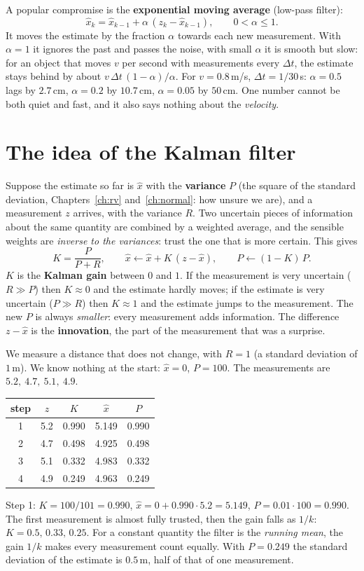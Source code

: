 A popular compromise is the \textbf{exponential moving average} (low-pass filter):
\[
\hat x_k=\hat x_{k-1}+\alpha\,(z_k-\hat x_{k-1}),\qquad 0<\alpha\le1 .
\]
It moves the estimate by the fraction $\alpha$ towards each new measurement. With $\alpha=1$ it ignores the past and passes the noise, with small $\alpha$ it is smooth but slow: for an object that moves $v$ per second with measurements every $\Delta t$, the estimate stays behind by about $v\,\Delta t\,(1-\alpha)/\alpha$. For $v=0.8$\,m/s, $\Delta t=1/30$\,s: $\alpha=0.5$ lags by $2.7$\,cm, $\alpha=0.2$ by $10.7$\,cm, $\alpha=0.05$ by $50$\,cm. One number cannot be both quiet and fast, and it also says nothing about the \emph{velocity}.

\section*{The idea of the Kalman filter}
Suppose the estimate so far is $\hat x$ with the \textbf{variance} $P$ (the square of the standard deviation, Chapters~\ref{ch:rv} and~\ref{ch:normal}: how unsure we are), and a measurement $z$ arrives, with the variance $R$. Two uncertain pieces of information about the same quantity are combined by a weighted average, and the sensible weights are \emph{inverse to the variances}: trust the one that is more certain. This gives
\[
K=\frac{P}{P+R},\qquad \hat x\leftarrow\hat x+K\,(z-\hat x),\qquad P\leftarrow(1-K)\,P .
\]
$K$ is the \textbf{Kalman gain} between $0$ and $1$. If the measurement is very uncertain ($R\gg P$) then $K\approx0$ and the estimate hardly moves; if the estimate is very uncertain ($P\gg R$) then $K\approx1$ and the estimate jumps to the measurement. The new $P$ is always \emph{smaller}: every measurement adds information. The difference $z-\hat x$ is the \textbf{innovation}, the part of the measurement that was a surprise.

\begin{example}
We measure a distance that does not change, with $R=1$ (a standard deviation of $1$\,m). We know nothing at the start: $\hat x=0$, $P=100$. The measurements are $5.2,\ 4.7,\ 5.1,\ 4.9$.
\begin{center}\small
\begin{tabular}{c c c c c}
\hline
step & $z$ & $K$ & $\hat x$ & $P$\\\hline
1 & 5.2 & 0.990 & 5.149 & 0.990\\
2 & 4.7 & 0.498 & 4.925 & 0.498\\
3 & 5.1 & 0.332 & 4.983 & 0.332\\
4 & 4.9 & 0.249 & 4.963 & 0.249\\\hline
\end{tabular}
\end{center}
Step 1: $K=100/101=0.990$, $\hat x=0+0.990\cdot5.2=5.149$, $P=0.01\cdot100=0.990$. The first measurement is almost fully trusted, then the gain falls as $1/k$: $K=0.5,\,0.33,\,0.25$. For a constant quantity the filter is the \emph{running mean}, the gain $1/k$ makes every measurement count equally. With $P=0.249$ the standard deviation of the estimate is $0.5$\,m, half of that of one measurement.
\end{example}

